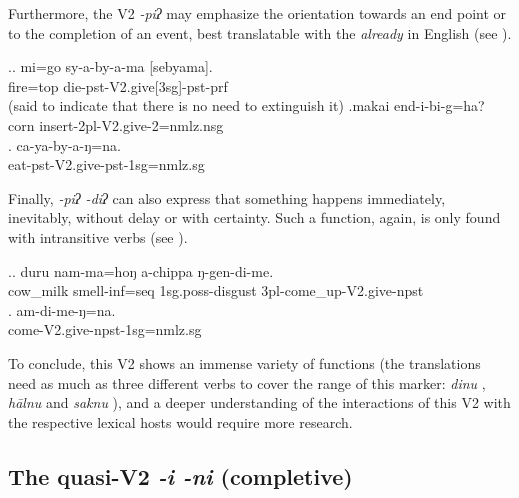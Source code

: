 Furthermore, the  V2 \emph{-piʔ} may emphasize the orientation towards an end point or to the completion of an event, best translatable with the  \emph{already} in English (see \Next).

\ex.\ag. mi=go sy-a-by-a-ma [sebyama].\\
 fire{\sc =top} die{\sc -pst-V2.give[3sg]-pst-prf}\\
   (said to indicate that there is no need to extinguish it)
\bg.makai end-i-bi-g=ha?\\
 corn insert{\sc -2pl-V2.give-2=nmlz.nsg}\\
 \bg. ca-ya-by-a-ŋ=na.\\
 eat{\sc -pst-V2.give-pst-1sg=nmlz.sg}\\


Finally, \emph{-piʔ \ti -diʔ} can also express that something happens immediately,  inevitably, without delay or with certainty. Such a function, again, is only found with intransitive verbs (see \Next). 

	\ex.\ag. duru nam-ma=hoŋ a-chippa ŋ-gen-di-me.\\
	cow\_milk smell{\sc -inf=seq} {\sc 1sg.poss-}disgust {\sc 3pl-}come\_up{\sc -V2.give-npst}\\
 	\bg. am-di-me-ŋ=na.\\
		come{\sc -V2.give-npst-1sg=nmlz.sg}\\
	
To conclude, this V2 shows an immense variety of functions (the  translations need as much as three different verbs to cover the range of this marker: \emph{dinu} , \emph{hālnu}  and \emph{saknu} ), and a deeper understanding of the interactions of this V2 with the respective lexical hosts would require more research.



\subsection{The quasi-V2 \emph{-i \ti -ni} (completive)}\label{V2-compl}

